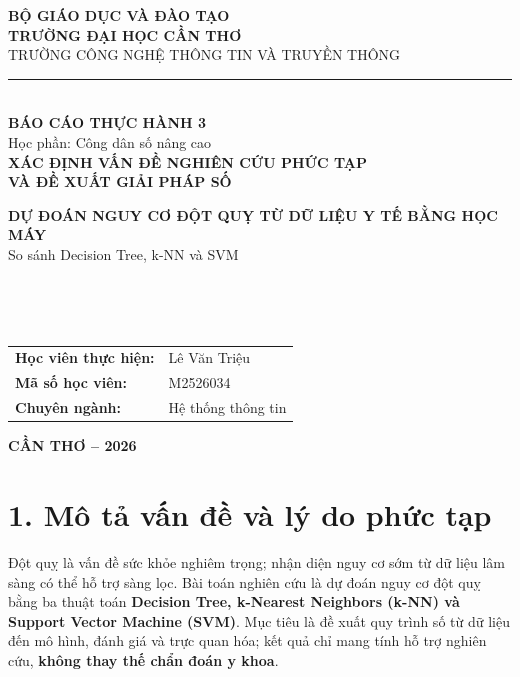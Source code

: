 \documentclass[12pt,a4paper]{article}
\begin{document}
\begin{titlepage}
\thispagestyle{empty}
\begin{center}
{\bfseries\large BỘ GIÁO DỤC VÀ ĐÀO TẠO}\\[3pt]
{\bfseries\large TRƯỜNG ĐẠI HỌC CẦN THƠ}\\[2pt]
{\large TRƯỜNG CÔNG NGHỆ THÔNG TIN VÀ TRUYỀN THÔNG}\\[10pt]
{\color{ctublue}\rule{0.72\textwidth}{1.2pt}}\\[25pt]
{\Huge\bfseries\color{ctublue} BÁO CÁO THỰC HÀNH 3}\\[10pt]
{\Large Học phần: Công dân số nâng cao}\\[27pt]
{\large\bfseries XÁC ĐỊNH VẤN ĐỀ NGHIÊN CỨU PHỨC TẠP\\[7pt] VÀ ĐỀ XUẤT GIẢI PHÁP SỐ}\\[20pt]
\begin{minipage}{0.9\textwidth}\centering
{\LARGE\bfseries DỰ ĐOÁN NGUY CƠ ĐỘT QUỴ TỪ DỮ LIỆU Y TẾ BẰNG HỌC MÁY}\\[8pt]
{\large So sánh Decision Tree, k-NN và SVM}
\end{minipage}\\[28pt]
\\[30pt]
\end{center}
\noindent\begin{tabularx}{\textwidth}{@{}lX@{}}
\textbf{Học viên thực hiện:} & Lê Văn Triệu\\
\textbf{Mã số học viên:} & M2526034\\
\textbf{Chuyên ngành:} & Hệ thống thông tin\\
\end{tabularx}
\vfill
\begin{center}\textbf{CẦN THƠ -- 2026}\end{center}
\end{titlepage}
\setcounter{page}{1}
\section*{1. Mô tả vấn đề và lý do phức tạp}
Đột quỵ là vấn đề sức khỏe nghiêm trọng; nhận diện nguy cơ sớm từ dữ liệu lâm sàng có thể hỗ trợ sàng lọc. Bài toán nghiên cứu là dự đoán nguy cơ đột quỵ bằng ba thuật toán \textbf{Decision Tree, k-Nearest Neighbors (k-NN) và Support Vector Machine (SVM)}. Mục tiêu là đề xuất quy trình số từ dữ liệu đến mô hình, đánh giá và trực quan hóa; kết quả chỉ mang tính hỗ trợ nghiên cứu, \textbf{không thay thế chẩn đoán y khoa}.
\end{document}
